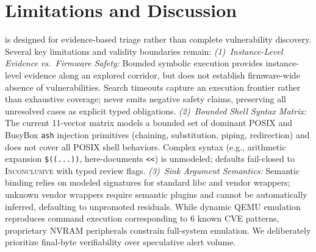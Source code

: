 \section{Limitations and Discussion}
\label{sec:discussion}

\tool is designed for evidence-based triage rather than complete vulnerability discovery. Several key limitations and validity boundaries remain:
\emph{(1)~Instance-Level Evidence vs.\ Firmware Safety:} Bounded symbolic execution provides instance-level evidence along an explored corridor, but does not establish firmware-wide absence of vulnerabilities. Search timeouts capture an execution frontier rather than exhaustive coverage; \tool never emits negative safety claims, preserving all \TSDSReviewCampaignResidual{} unresolved cases as explicit typed obligations.
\emph{(2)~Bounded Shell Syntax Matrix:} The current 11-vector matrix models a bounded set of dominant POSIX and BusyBox \texttt{ash} injection primitives (chaining, substitution, piping, redirection) and does not cover all POSIX shell behaviors. Complex syntax (e.g., arithmetic expansion \texttt{\$((...))}, here-documents \texttt{<<}) is unmodeled; \tool defaults fail-closed to \textsc{Inconclusive} with typed review flags.
\emph{(3)~Sink Argument Semantics:} Semantic binding relies on modeled signatures for standard libc and vendor wrappers; unknown vendor wrappers require semantic plugins and cannot be automatically inferred, defaulting to unpromoted residuals. While dynamic QEMU emulation reproduces command execution corresponding to 6 known CVE patterns, proprietary NVRAM peripherals constrain full-system emulation. We deliberately prioritize final-byte verifiability over speculative alert volume.
